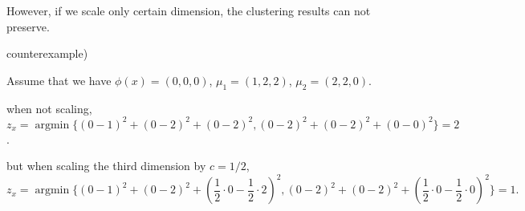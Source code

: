 \documentclass[a4paper]{article}
\begin{document}
\begin{enumerate}[label=\alph*.]
        However, if we scale only certain dimension, the clustering results can not preserve.
        
        counterexample) 
        
        Assume that we have $\phi(x) = (0, 0, 0)$, $\mu_1 = (1, 2, 2)$, $\mu_2 = (2, 2, 0)$.
        
        when not scaling, $z_x = \operatorname{argmin}\{(0-1)^2+(0-2)^2+(0-2)^2, (0-2)^2+(0-2)^2+(0-0)^2\} = 2$.
        
        but when scaling the third dimension by $c=1/2$, $$z_x = \operatorname{argmin}\{(0-1)^2+(0-2)^2+(\frac{1}{2} \cdot 0-\frac{1}{2} \cdot 2)^2, (0-2)^2+(0-2)^2+(\frac{1}{2} \cdot 0-\frac{1}{2} \cdot 0)^2\} = 1.$$

    \end{enumerate}
\end{document}

